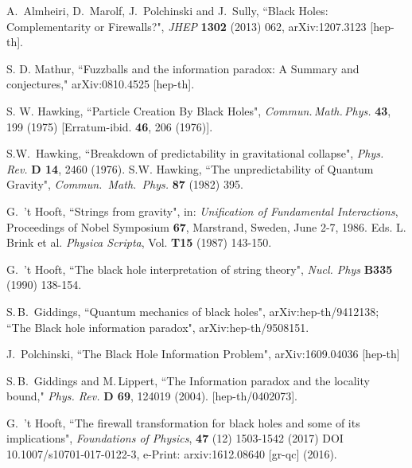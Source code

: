 \documentclass[12pt]{article}
\begin{document}
\begin{thebibliography}{99}
 A.\ Almheiri, D.\ Marolf, J.\ Polchinski and J.\ Sully, ``Black Holes: Complementarity or Firewalls?", \textit{JHEP} \textbf{1302}  (2013) 062, arXiv:1207.3123 [hep-th].

 S. D. Mathur, ``Fuzzballs and the information paradox: A Summary and conjectures,"  arXiv:0810.4525 [hep-th]. 

S. W. Hawking, ``Particle Creation By Black Holes", \textit{Commun.\,Math.\,Phys.} \textbf{43}, 199 (1975) [Erratum-ibid. \textbf{46}, 206 (1976)].

S.W.~Hawking, ``Breakdown of predictability in gravitational collapse", \textit{Phys. Rev.} \textbf{D 14}, 2460 (1976).                             
 S.W. Hawking, ``The unpredictability of Quantum Gravity",  \textit{Commun.~Math.~Phys.} \textbf{87} (1982) 395.

G.\ 't Hooft, ``Strings from gravity", in: \textit{Unification of Fundamental Interactions}, Proceedings of Nobel Symposium \textbf{67}, Marstrand, Sweden, June 2-7, 1986. Eds. L. Brink et al. \textit{Physica Scripta}, Vol. \textbf{T15} (1987) 143-150.

G.\ 't Hooft,  ``The black hole interpretation of string theory", \textit{Nucl. Phys} \textbf{B335} (1990) 138-154.


S.\,B.\ Giddings, ``Quantum mechanics of black holes", arXiv:hep-th/9412138;\\
 ``The Black hole information paradox", arXiv:hep-th/9508151.

 J.\ Polchinski, ``The Black Hole Information Problem", arXiv:1609.04036 [hep-th] 

S.\,B.~Giddings and M.\,Lippert, ``The Information paradox and the locality bound," \textit{Phys. Rev.} \textbf{D 69}, 124019 (2004). [hep-th/0402073]. 

 G.~'t Hooft, ``The firewall transformation for black holes and some of its implications", \textit{Foundations of Physics}, \textbf{47} (12) 1503-1542 (2017) DOI 10.1007/s10701-017-0122-3, e-Print: arxiv:1612.08640 [gr-qc] (2016).

\end{thebibliography}
\end{document}

